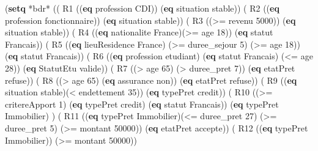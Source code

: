 \documentclass[
]{article}
\newenvironment{Shaded}{}{}
\newcommand{\DecValTok}[1]{\textcolor[rgb]{0.25,0.63,0.44}{#1}}
\newcommand{\KeywordTok}[1]{\textcolor[rgb]{0.00,0.44,0.13}{\textbf{#1}}}
\newcommand{\NormalTok}[1]{#1}
\newcommand{\OperatorTok}[1]{\textcolor[rgb]{0.40,0.40,0.40}{#1}}
\begin{document}
\begin{Shaded}
\begin{Highlighting}[]
\NormalTok{(}\KeywordTok{setq}\NormalTok{ *bdr*}
\NormalTok{\textquotesingle{}(( R1 ((}\KeywordTok{eq}\NormalTok{ profession CDI)) (}\KeywordTok{eq}\NormalTok{ situation stable))}
\NormalTok{( R2 ((}\KeywordTok{eq}\NormalTok{ profession fonctionnaire)) (}\KeywordTok{eq}\NormalTok{ situation stable))}
\NormalTok{( R3 ((}\OperatorTok{\textgreater{}=}\NormalTok{ revenu }\DecValTok{5000}\NormalTok{)) (}\KeywordTok{eq}\NormalTok{ situation stable))}
\NormalTok{( R4 ((}\KeywordTok{eq}\NormalTok{ nationalite France)(}\OperatorTok{\textgreater{}=}\NormalTok{ age }\DecValTok{18}\NormalTok{)) (}\KeywordTok{eq}\NormalTok{ statut Francais))}
\NormalTok{( R5 ((}\KeywordTok{eq}\NormalTok{ lieuResidence France) (}\OperatorTok{\textgreater{}=}\NormalTok{ duree\_sejour }\DecValTok{5}\NormalTok{) (}\OperatorTok{\textgreater{}=}\NormalTok{ age }\DecValTok{18}\NormalTok{)) (}\KeywordTok{eq}\NormalTok{ statut Francais))}
\NormalTok{( R6 ((}\KeywordTok{eq}\NormalTok{ profession etudiant) (}\KeywordTok{eq}\NormalTok{ statut Francais) (}\OperatorTok{\textless{}=}\NormalTok{ age }\DecValTok{28}\NormalTok{)) (}\KeywordTok{eq}\NormalTok{ StatutEtu valide))}
\NormalTok{( R7 ((}\OperatorTok{\textgreater{}}\NormalTok{ age }\DecValTok{65}\NormalTok{) (}\OperatorTok{\textgreater{}}\NormalTok{ duree\_pret }\DecValTok{7}\NormalTok{)) (}\KeywordTok{eq}\NormalTok{ etatPret refuse))}
\NormalTok{( R8 ((}\OperatorTok{\textgreater{}}\NormalTok{ age }\DecValTok{65}\NormalTok{) (}\KeywordTok{eq}\NormalTok{ assurance non)) (}\KeywordTok{eq}\NormalTok{ etatPret refuse))}
\NormalTok{( R9 ((}\KeywordTok{eq}\NormalTok{ situation stable)(}\OperatorTok{\textless{}}\NormalTok{ endettement }\DecValTok{35}\NormalTok{)) (}\KeywordTok{eq}\NormalTok{ typePret credit))}
\NormalTok{( R10 ((}\OperatorTok{\textgreater{}=}\NormalTok{ critereApport }\DecValTok{1}\NormalTok{) (}\KeywordTok{eq}\NormalTok{ typePret credit) (}\KeywordTok{eq}\NormalTok{ statut Francais)) }
\NormalTok{        (}\KeywordTok{eq}\NormalTok{ typePret Immobilier) )}
\NormalTok{( R11 ((}\KeywordTok{eq}\NormalTok{ typePret Immobilier)(}\OperatorTok{\textless{}=}\NormalTok{ duree\_pret }\DecValTok{27}\NormalTok{) (}\OperatorTok{\textgreater{}=}\NormalTok{ duree\_pret }\DecValTok{5}\NormalTok{) (}\OperatorTok{\textgreater{}=}\NormalTok{ montant }\DecValTok{50000}\NormalTok{)) }
\NormalTok{        (}\KeywordTok{eq}\NormalTok{ etatPret accepte))}
\NormalTok{( R12 ((}\KeywordTok{eq}\NormalTok{ typePret Immobilier)) (}\OperatorTok{\textgreater{}=}\NormalTok{ montant }\DecValTok{50000}\NormalTok{))}

\end{Highlighting}
\end{Shaded}
\end{document}
